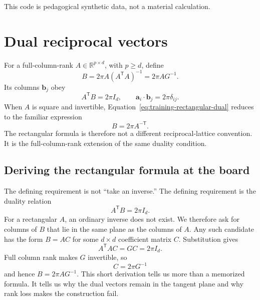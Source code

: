 This code is pedagogical synthetic data, not a material calculation.


\section{Dual reciprocal vectors}

For a full-column-rank $A\in\mathbb R^{p\times d}$, with $p\geq d$, define
\begin{equation}
  B=2\pi A\left(A^{\mathsf T}A\right)^{-1}
   =2\pi A G^{-1}.
  \label{eq:training-rectangular-dual}
\end{equation}
Its columns $\mathbf b_j$ obey
\begin{equation}
  A^{\mathsf T}B=2\pi I_d,
  \qquad
  \mathbf a_i\cdot\mathbf b_j=2\pi\delta_{ij}.
  \label{eq:training-dual-identity}
\end{equation}
When $A$ is square and invertible, Equation~\eqref{eq:training-rectangular-dual}
reduces to the familiar expression
\begin{equation}
  B=2\pi A^{-\mathsf T}.
  \label{eq:training-square-dual}
\end{equation}
The rectangular formula is therefore not a different reciprocal-lattice
convention. It is the full-column-rank extension of the same duality condition.

\subsection{Deriving the rectangular formula at the board}

The defining requirement is not ``take an inverse.'' The defining requirement
is the duality relation
\begin{equation}
  A^{\mathsf T}B=2\pi I_d.
\end{equation}
For a rectangular $A$, an ordinary inverse does not exist. We therefore ask for
columns of $B$ that lie in the same plane as the columns of $A$. Any such
candidate has the form $B=AC$ for some $d\times d$ coefficient matrix $C$.
Substitution gives
\begin{equation}
  A^{\mathsf T}AC=GC=2\pi I_d.
\end{equation}
Full column rank makes $G$ invertible, so
\begin{equation}
  C=2\pi G^{-1}
\end{equation}
and hence $B=2\pi AG^{-1}$. This short derivation tells us more than a memorized
formula. It tells us why the dual vectors remain in the tangent plane and why
rank loss makes the construction fail.

